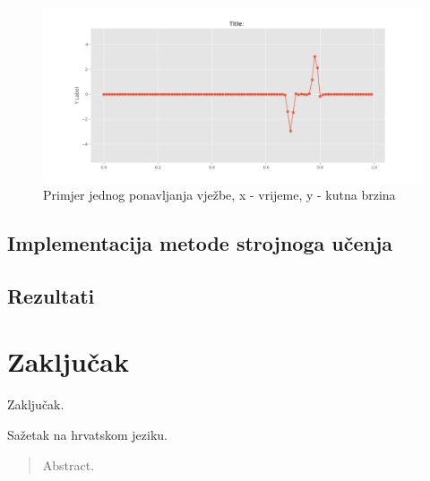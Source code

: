 \documentclass[times, utf8, diplomski]{fer}
\begin{document}
\begin{figure}
    \includegraphics[width=\textwidth]{period.png}
    \caption{Primjer jednog ponavljanja vježbe, x - vrijeme, y - kutna brzina}
    \label{period}
\end{figure}

\section{Implementacija metode strojnoga učenja}

\section{Rezultati}

\chapter{Zaključak}
Zaključak.




\begin{sazetak}
Sažetak na hrvatskom jeziku.

\end{sazetak}

\begin{abstract}
Abstract.

\end{abstract}
\end{document}
